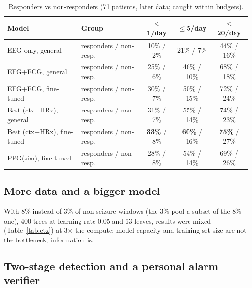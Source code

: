 \begin{table}[H]
\centering\small
\caption{Responders vs non-responders (71 patients, later data; caught within budgets).}
\begin{tabular}{@{}llccc@{}}
\toprule
Model & Group & $\le$1/day & $\le$5/day & $\le$20/day \\
\midrule
EEG only, general & responders / non-resp. & 10\% / 2\% & 21\% / 7\% & 44\% / 16\% \\
EEG+ECG, general & responders / non-resp. & 25\% / 6\% & 46\% / 10\% & 68\% / 18\% \\
EEG+ECG, fine-tuned & responders / non-resp. & 30\% / 7\% & 50\% / 15\% & 72\% / 24\% \\
Best (ctx+HRx), general & responders / non-resp. & 31\% / 7\% & 55\% / 14\% & 74\% / 23\% \\
Best (ctx+HRx), fine-tuned & responders / non-resp. & \textbf{33\%} / 8\% & \textbf{60\%} / 16\% & \textbf{75\%} / 27\% \\
PPG(sim), fine-tuned & responders / non-resp. & 28\% / 8\% & 54\% / 14\% & 69\% / 26\% \\
\bottomrule
\end{tabular}
\end{table}

\subsection{More data and a bigger model}
\label{sec:big}

With 8\% instead of 3\% of non-seizure windows (the 3\% pool a subset of the 8\% one), 400 trees at learning rate 0.05 and 63 leaves, results were mixed (Table~\ref{tab:ctx}) at 3$\times$ the compute: model capacity and training-set size are not the bottleneck; information is.

\subsection{Two-stage detection and a personal alarm verifier}

